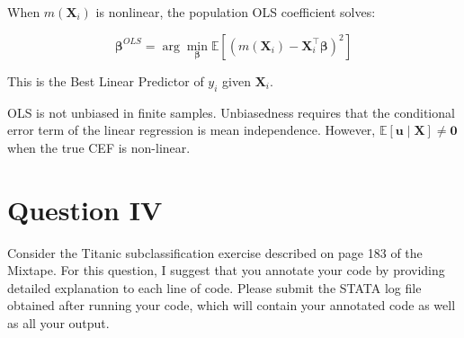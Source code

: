 \documentclass[letterpaper,12pt]{article}
\begin{document}
\begin{enumerate}[label=(\alph*)]
 When $m(\mathbf{X}_i)$ is nonlinear, the population OLS coefficient solves:

$$\boldsymbol{\beta}^{OLS} = \arg\min_{\boldsymbol{\beta}} \mathbb{E}\!\left[(m(\mathbf{X}_i) - \mathbf{X}_i^\top\boldsymbol{\beta})^2\right]$$

This is the Best Linear Predictor of $y_i$ given $\mathbf{X}_i$.

OLS is not unbiased in finite samples. Unbiasedness requires that the conditional error term of the linear regression is mean independence. However, $\mathbb{E}[\mathbf{u} \mid \mathbf{X}] \neq \mathbf{0}$ when the true CEF is non-linear.




\end{enumerate}


\section*{Question IV}
Consider the Titanic subclassification exercise described on page 183 of the Mixtape. For this question, I suggest that you annotate your code by providing detailed explanation to each line of code. Please submit the STATA log file obtained after running your code, which will contain your annotated code as well as all your output.
\end{document}
